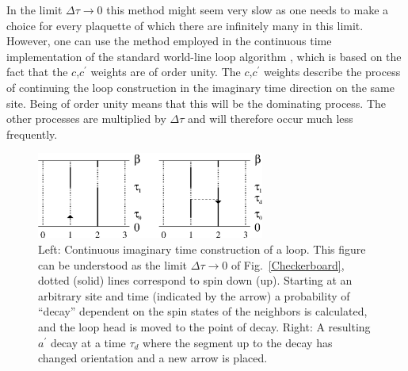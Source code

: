 \documentclass[10pt,pre,aps,twocolumn,showpacs,superscriptaddress,
floatfix]{revtex4}
\newcommand{\Deltatau}{\Delta \tau}
\begin{document}
In the limit $\Deltatau \to 0$ this method might seem very slow as one needs
to make a choice for every plaquette of which there are infinitely many in 
this limit. However, one can use the method employed in the continuous time 
implementation of the standard world-line
loop algorithm \cite {beard}, which is based on the fact 
that the $c$,$c^\prime$ weights are of order unity. The $c$,$c^\prime$ weights
describe the process of continuing the loop construction in the imaginary 
time direction on the same site. Being of order unity means that this will be 
the dominating process. The other processes are multiplied by $\Deltatau$ and 
will therefore occur much less frequently. 

\begin{figure}
\includegraphics[clip,width=7.5cm]{fig12.eps}
\caption{Left: Continuous imaginary time construction of a loop. This figure 
can be understood as the limit $\Deltatau \to 0$ of Fig.~\ref{Checkerboard}, 
dotted (solid) lines correspond to spin down (up). Starting at an arbitrary 
site and time (indicated by the arrow) 
a probability of ``decay'' dependent on the spin 
states of the neighbors is calculated, and the loop head is moved to the 
point of decay. Right: A resulting $a^\prime$ decay at a time $\tau_d$ 
where the segment up to the decay has changed orientation and a new arrow 
is placed.}
\label{example}
\end{figure} 
\end{document}
